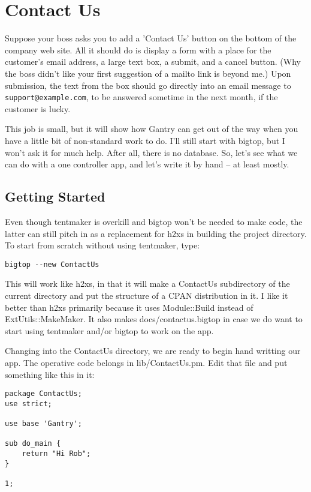\chapter{Contact Us}
\label{chap:contactus}

Suppose your boss asks you to add a 'Contact Us' button on the bottom of the
company web site.  All it should do is display a form with a place for the
customer's email address, a large text box, a submit, and a cancel button.
(Why the boss didn't like your first suggestion of a mailto link is
beyond me.)  Upon submission, the text from the box should go directly into
an email message to \verb+support@example.com+, to be answered sometime in the
next month, if the customer is lucky.

This job is small, but it will show how Gantry can get out of the way when
you have a little bit of non-standard work to do.  I'll still start with
bigtop, but I won't ask it for much help.  After all, there is no database.
So, let's see what we can do with a one controller app, and let's write it
by hand -- at least mostly.

\section{Getting Started}

Even though tentmaker is overkill and bigtop won't be needed to make
code, the latter can still pitch in as a replacement for h2xs in building
the project directory.  To start from scratch without using tentmaker,
type:

\begin{verbatim}
bigtop --new ContactUs
\end{verbatim}

This will work like h2xs, in that it will make a ContactUs subdirectory of
the current directory and put the structure of a CPAN distribution in it.
I like it better than h2xs primarily because it uses Module::Build instead of
ExtUtils::MakeMaker.  It also makes docs/contactus.bigtop in case we do want
to start using tentmaker and/or bigtop to work on the app.

Changing into the ContactUs directory, we are ready to begin hand writting
our app.  The operative code belongs in lib/ContactUs.pm.  Edit that file
and put something like this in it:

\begin{verbatim}
package ContactUs;
use strict;

use base 'Gantry';

sub do_main {
    return "Hi Rob";
}

1;
\end{verbatim}

